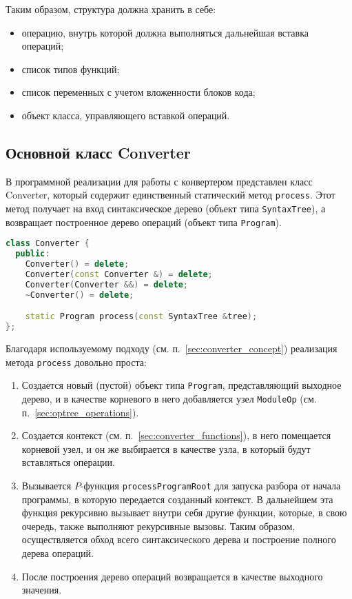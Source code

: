 
Таким образом, структура должна хранить в себе:

\begin{itemize}
    \item операцию, внутрь которой должна выполняться дальнейшая вставка операций;
    \item список типов функций;
    \item список переменных с учетом вложенности блоков кода;
    \item объект класса, управляющего вставкой операций.
\end{itemize}

\subsection{Основной класс Converter}

В программной реализации для работы с конвертером представлен класс Converter, который содержит единственный статический метод \verb|process|.
Этот метод получает на вход синтаксическое дерево (объект типа \verb|SyntaxTree|), а возвращает построенное дерево операций (объект типа \verb|Program|).

\begin{lstlisting}[language=C++, caption=Объявление класса Converter]
class Converter {
  public:
    Converter() = delete;
    Converter(const Converter &) = delete;
    Converter(Converter &&) = delete;
    ~Converter() = delete;

    static Program process(const SyntaxTree &tree);
};
\end{lstlisting}

Благодаря используемому подходу (см. п.~\ref{sec:converter_concept}) реализация метода \verb|process| довольно проста:

\begin{enumerate}
    \item Создается новый (пустой) объект типа \verb|Program|, представляющий выходное дерево, и в качестве корневого в него добавляется узел \verb|ModuleOp| (см. п.~\ref{sec:optree_operations}).
    \item Создается контекст (см. п.~\ref{sec:converter_functions}), в него помещается корневой узел, и он же выбирается в качестве узла, в который будут вставляться операции.
    \item Вызывается \(P\)-функция \verb|processProgramRoot| для запуска разбора от начала программы, в которую передается созданный контекст.
          В дальнейшем эта функция рекурсивно вызывает внутри себя другие функции, которые, в свою очередь, также выполняют рекурсивные вызовы.
          Таким образом, осуществляется обход всего синтаксического дерева и построение полного дерева операций.
    \item После построения дерево операций возвращается в качестве выходного значения.
\end{enumerate}
